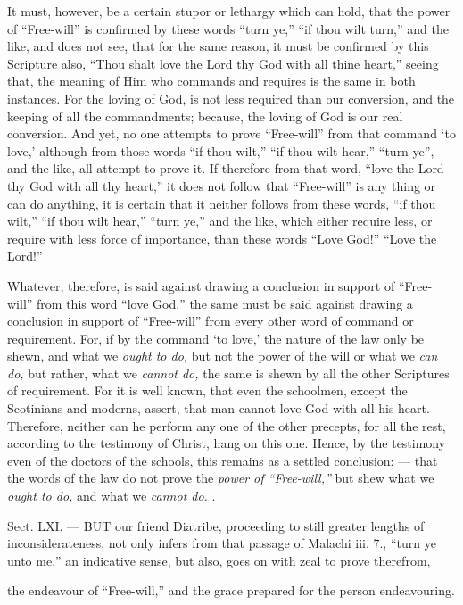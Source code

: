 It must, however, be a certain stupor or lethargy which can hold, that the power of “Free-will” is confirmed by these words “turn ye,” “if thou wilt turn,” and the like, and does not see, that for the same reason, it must be confirmed by this Scripture also, “Thou shalt love the Lord thy God with all thine heart,” seeing that, the meaning of Him who commands and requires is the same in both instances. For the loving of God, is not less required than our conversion, and the keeping of all the commandments; because, the loving of God is our real conversion. And yet, no one attempts to prove “Free-will” from that command ‘to love,’ although from those words “if thou wilt,” “if thou wilt hear,” “turn ye”, and the like, all attempt to prove it. If therefore from that word, “love the Lord thy God with all thy heart,” it does not follow that “Free-will” is any thing or can do anything, it is certain that it neither follows from these words, “if thou wilt,” “if thou wilt hear,” “turn ye,” and the like, which either require less, or require with less force of importance, than these words “Love God!” “Love the Lord!”

Whatever, therefore, is said against drawing a conclusion in support of “Free-will” from this word “love God,” the same must be said against drawing a conclusion in support of “Free-will” from every other word of command or requirement. For, if by the command ‘to love,’ the nature of the law only be shewn, and what we \emph{ought to do, }but not the power of the will or what we \emph{can do, }but rather, what we \emph{cannot do, }the same is shewn by all the other Scriptures of requirement. For it is well known, that even the schoolmen, except the Scotinians and moderns, assert, that man cannot love God with all his heart. Therefore, neither can he perform any one of the other precepts, for all the rest, according to the testimony of Christ, hang on this one. Hence, by the testimony even of the doctors of the schools, this remains as a settled conclusion: — that the words of the law do not prove the \emph{power of “Free-will,” }but shew what we \emph{ought to do, }and what we \emph{cannot do.} .


Sect. LXI. — BUT our friend Diatribe, proceeding to still greater lengths of inconsiderateness, not only infers from that passage of Malachi iii. 7., “turn ye unto me,” an indicative sense, but also, goes on with zeal to prove therefrom,

the endeavour of “Free-will,” and the grace prepared for the person endeavouring.


